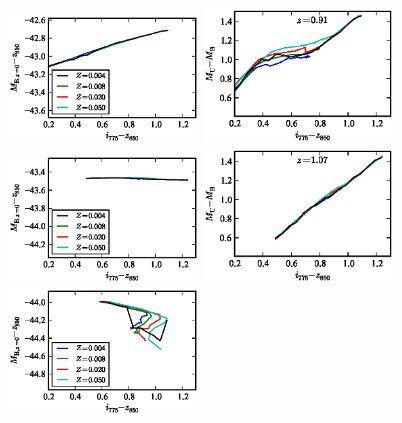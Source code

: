 \begin{figure}[p]
\begin{center}
\includegraphics[width=0.45\textwidth]{figures/clrate/kcorr_mag_z1.eps}%
\includegraphics[width=0.45\textwidth]{figures/clrate/kcorr_color_z1.eps}
\includegraphics[width=0.45\textwidth]{figures/clrate/kcorr_mag_z2.eps}%
\includegraphics[width=0.45\textwidth]{figures/clrate/kcorr_color_z2.eps}
\includegraphics[width=0.45\textwidth]{figures/clrate/kcorr_mag_z3.eps}%

\end{center}
\end{figure}
